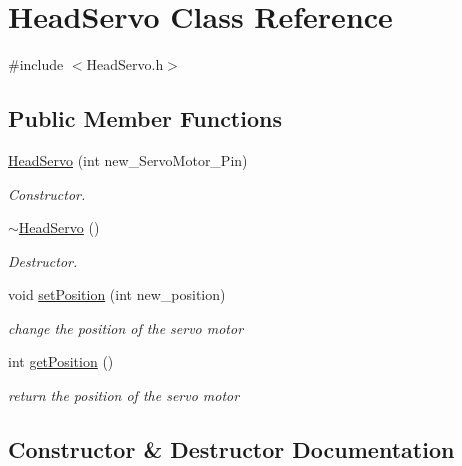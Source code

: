 \hypertarget{class_head_servo}{}\section{Head\+Servo Class Reference}
\label{class_head_servo}


{\ttfamily \#include $<$Head\+Servo.\+h$>$}

\subsection*{Public Member Functions}
\begin{DoxyCompactItemize}
\item 
\hyperlink{class_head_servo_a00a9d85e37f10d76ee577b9a405f1370}{Head\+Servo} (int new\+\_\+\+Servo\+Motor\+\_\+\+Pin)
\begin{DoxyCompactList}\small\item\em Constructor. \end{DoxyCompactList}\item 
\hyperlink{class_head_servo_a5d60523eb1986f36cba6aff92afee0b7}{$\sim$\+Head\+Servo} ()
\begin{DoxyCompactList}\small\item\em Destructor. \end{DoxyCompactList}\item 
void \hyperlink{class_head_servo_a43ae8a0a9b586c55cd4e59a779eea4a9}{set\+Position} (int new\+\_\+position)
\begin{DoxyCompactList}\small\item\em change the position of the servo motor \end{DoxyCompactList}\item 
int \hyperlink{class_head_servo_a84eadc00f5cdd262d1b212a306a0930c}{get\+Position} ()
\begin{DoxyCompactList}\small\item\em return the position of the servo motor \end{DoxyCompactList}\end{DoxyCompactItemize}


\subsection{Constructor \& Destructor Documentation}
\mbox{\label{class_head_servo_a00a9d85e37f10d76ee577b9a405f1370}} 
